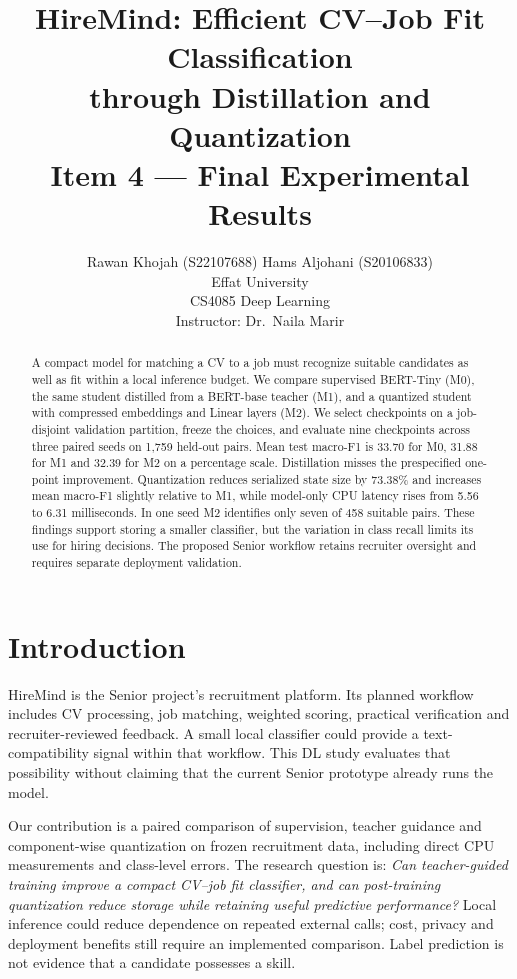 \documentclass[11pt]{article}
\title{HireMind: Efficient CV--Job Fit Classification\\through Distillation and Quantization\\[4pt]\large Item 4 --- Final Experimental Results}
\author{Rawan Khojah (S22107688) \quad Hams Aljohani (S20106833)\\Effat University\\CS4085 Deep Learning\\Instructor: Dr.\ Naila Marir}
\begin{document}
\maketitle
\pagestyle{plain}
\begin{abstract}
A compact model for matching a CV to a job must recognize suitable candidates as well as fit within a local inference budget. We compare supervised BERT-Tiny (M0), the same student distilled from a BERT-base teacher (M1), and a quantized student with compressed embeddings and Linear layers (M2). We select checkpoints on a job-disjoint validation partition, freeze the choices, and evaluate nine checkpoints across three paired seeds on 1,759 held-out pairs. Mean test macro-F1 is 33.70 for M0, 31.88 for M1 and 32.39 for M2 on a percentage scale. Distillation misses the prespecified one-point improvement. Quantization reduces serialized state size by 73.38\% and increases mean macro-F1 slightly relative to M1, while model-only CPU latency rises from 5.56 to 6.31 milliseconds. In one seed M2 identifies only seven of 458 suitable pairs. These findings support storing a smaller classifier, but the variation in class recall limits its use for hiring decisions. The proposed Senior workflow retains recruiter oversight and requires separate deployment validation.
\end{abstract}


\section{Introduction}
HireMind is the Senior project's recruitment platform. Its planned workflow includes CV processing, job matching, weighted scoring, practical verification and recruiter-reviewed feedback. A small local classifier could provide a text-compatibility signal within that workflow. This DL study evaluates that possibility without claiming that the current Senior prototype already runs the model.

Our contribution is a paired comparison of supervision, teacher guidance and component-wise quantization on frozen recruitment data, including direct CPU measurements and class-level errors. The research question is: \emph{Can teacher-guided training improve a compact CV--job fit classifier, and can post-training quantization reduce storage while retaining useful predictive performance?} Local inference could reduce dependence on repeated external calls; cost, privacy and deployment benefits still require an implemented comparison. Label prediction is not evidence that a candidate possesses a skill.
\end{document}
